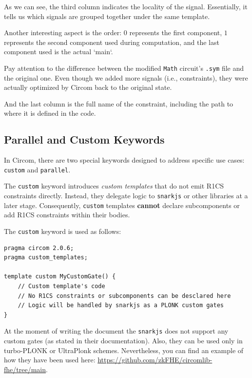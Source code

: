 \documentclass[../lecture-notes-148x210.tex]{subfiles}
\begin{document}
As we can see, the third column indicates the locality of the signal.
Essentially, it tells us which signals are grouped together under the same template.

Another interesting aspect is the order: $0$ represents the first component, $1$ represents the second component used during computation, and the last component used is the actual `main`.

\begin{remark}
    Pay attention to the difference between the modified \texttt{Math} circuit's \texttt{.sym} file and the original one.
    Even though we added more signals (i.e., constraints), they were actually optimized by Circom back to the original state.
\end{remark}

And the last column is the full name of the constraint, including the path to where it is defined in the code.

\subsection{Parallel and Custom Keywords}

In Circom, there are two special keywords designed to address specific use cases: \texttt{custom} and \texttt{parallel}.

The \texttt{custom} keyword introduces \emph{custom templates} that do not emit R1CS constraints directly.
Instead, they delegate logic to \texttt{snarkjs} or other libraries at a later stage.
Consequently, \texttt{custom} templates \textbf{cannot} declare subcomponents or add R1CS constraints within their bodies.

The \texttt{custom} keyword is used as follows:

\begin{lstlisting}[language=Circom,basicstyle=\ttfamily\footnotesize]
pragma circom 2.0.6;
pragma custom_templates;

template custom MyCustomGate() {
    // Custom template's code
    // No R1CS constraints or subcomponents can be desclared here
    // Logic will be handled by snarkjs as a PLONK custom gates
}
\end{lstlisting}

\begin{remark}
    At the moment of writing the document the \texttt{snarkjs} does not support any custom gates (as stated in their documentation).
    Also, they can be used only in turbo-PLONK or UltraPlonk schemes.
    Nevertheless, you can find an example of how they have been used here: \url{https://github.com/zkFHE/circomlib-fhe/tree/main}.
\end{remark}
\end{document}
